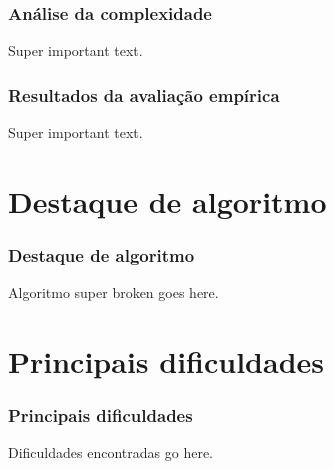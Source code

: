 \documentclass{beamer}
\begin{document}
\begin{frame}
  \frametitle{Análise da complexidade}
  Super important text.
\end{frame}

\begin{frame}
  \frametitle{Resultados da avaliação empírica}
  Super important text.
\end{frame}








\section{Destaque de algoritmo}

\begin{frame}[fragile]
\frametitle{Destaque de algoritmo}
Algoritmo super broken goes here.
\end{frame}







\section{Principais dificuldades}

\begin{frame}
\frametitle{Principais dificuldades}
Dificuldades encontradas go here.

\end{frame}






\end{document}
